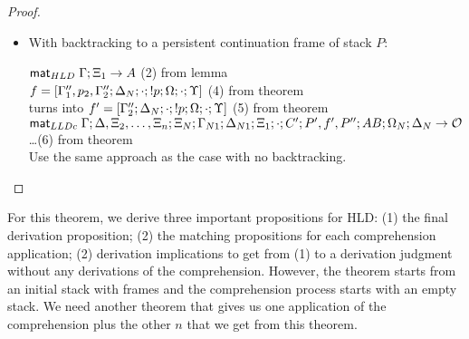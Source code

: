 \begin{proof}
\begin{itemize}[leftmargin=*]
   \item With backtracking to a persistent continuation frame of stack $P$:

      $\mathsf{mat}_{HLD} \; \Gamma; \Xi_1 \rightarrow A$ \hfill (2) from lemma \\

      $f = [\Gamma''_1, p_2, \Gamma''_2; \Delta_N; \cdot; {!} p; \Omega; \cdot; \Upsilon]$ \hfill (4) from theorem \\
      turns into $f' = [\Gamma''_2; \Delta_N; \cdot; {!} p; \Omega; \cdot;
      \Upsilon]$ \hfill (5) from theorem \\

      $\mathsf{mat}_{LLDc} \; \Gamma; \Delta, \Xi_2, \dotsc, \Xi_n; \Xi_N; \Gamma_{N1};
\Delta_{N1}; \Xi_1; \cdot; C'; P', f', P''; AB; \Omega_N; \Delta_N \rightarrow
\mathcal{O}$ \\ \dots \hfill (6) from theorem \\
         
      Use the same approach as the case with no backtracking.
      
\end{itemize}
\end{proof}

For this theorem, we derive three important propositions for HLD: (1) the final
derivation proposition; (2) the matching propositions for each comprehension
application; (2) derivation implications to get from (1) to a derivation
judgment without any derivations of the comprehension. However, the theorem
starts from an initial stack with frames and the comprehension process starts
with an empty stack. We need another theorem that gives us one application of
the comprehension plus the other $n$ that we get from this theorem.


